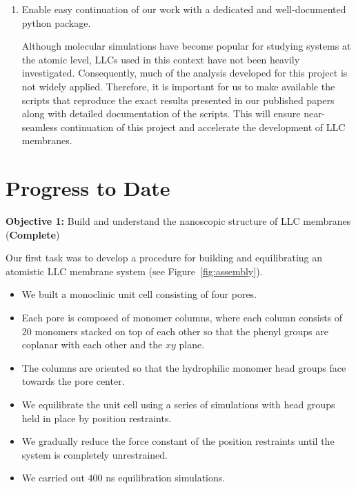 \documentclass{article}
\begin{document}
\begin{enumerate}
    \item Enable easy continuation of our work with a dedicated and 
    well-documented python package.
    
	Although molecular simulations have become popular
	for studying systems at the atomic level, LLCs used in this context
	have not been heavily investigated. Consequently, much of the 
	analysis developed for this project is not widely applied. Therefore, 
	it is important for us to make available the scripts that reproduce
	the exact results presented in our published papers along with detailed
	documentation of the scripts. This will ensure near-seamless continuation
	of this project and accelerate the development of LLC membranes.
    
  \end{enumerate}

  \section{Progress to Date}\label{section:progress}
  
  \textbf{\large Objective 1:} {\large Build and understand the nanoscopic structure of LLC membranes} (\textcolor{green!40!olive}{\textbf{Complete}})
  
  \noindent Our first task was to develop a procedure for building and equilibrating 
  an atomistic LLC membrane system (see Figure~\ref{fig:assembly}).
  \begin{itemize}
    \item We built a monoclinic unit cell consisting of four pores.
    \item Each pore is composed of monomer columns, where each column
    consists of 20 monomers stacked on top of each other so that the 
    phenyl groups are coplanar with each other and the $xy$ plane. 
    \item The columns are oriented so that the hydrophilic monomer head
    groups face towards the pore center.
    \item We equilibrate the unit cell using a series of simulations
    with head groups held in place by position restraints. 
    \item We gradually reduce the force constant of the position 
    restraints until the system is completely unrestrained.
    \item We carried out 400 ns equilibration simulations.
  \end{itemize}
  
\end{document}
